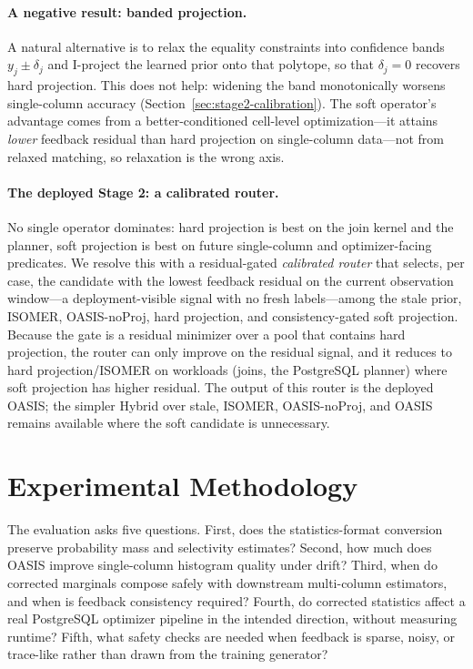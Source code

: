 \documentclass[preprint,12pt]{elsarticle}
\begin{document}
\paragraph{A negative result: banded projection.}
A natural alternative is to relax the equality constraints into confidence bands
$y_j\pm\delta_j$ and I-project the learned prior onto that polytope, so that
$\delta_j=0$ recovers hard projection. This does not help: widening the band
monotonically worsens single-column accuracy
(Section~\ref{sec:stage2-calibration}). The soft operator's advantage comes from
a better-conditioned cell-level optimization---it attains \emph{lower} feedback
residual than hard projection on single-column data---not from relaxed matching,
so relaxation is the wrong axis.

\paragraph{The deployed Stage 2: a calibrated router.}
No single operator dominates: hard projection is best on the join kernel and the
planner, soft projection is best on future single-column and optimizer-facing
predicates. We resolve this with a residual-gated \emph{calibrated router} that
selects, per case, the candidate with the lowest feedback residual on the current
observation window---a deployment-visible signal with no fresh labels---among the
stale prior, ISOMER, OASIS-noProj, hard projection, and consistency-gated soft
projection. Because the gate is a residual minimizer over a pool that contains
hard projection, the router can only improve on the residual signal, and it
reduces to hard projection/ISOMER on workloads (joins, the PostgreSQL planner)
where soft projection has higher residual. The output of this router is the
deployed OASIS; the simpler Hybrid over stale, ISOMER, OASIS-noProj, and OASIS
remains available where the soft candidate is unnecessary.

\section{Experimental Methodology}
\label{sec:experiments}

The evaluation asks five questions. First, does the statistics-format
conversion preserve probability mass and selectivity estimates? Second, how
much does OASIS improve single-column histogram quality under drift? Third,
when do corrected marginals compose safely with downstream multi-column
estimators, and when is feedback consistency required? Fourth, do corrected
statistics affect a real PostgreSQL optimizer pipeline in the intended
direction, without measuring runtime? Fifth, what safety checks are needed
when feedback is sparse, noisy, or trace-like rather than drawn from the
training generator?
\end{document}
